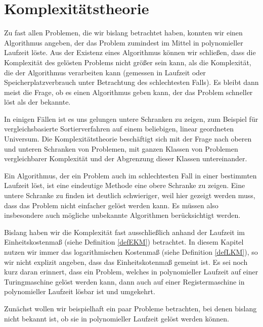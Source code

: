 \chapter{Komplexitätstheorie}
Zu fast allen Problemen, die wir bislang betrachtet haben, konnten wir einen Algorithmus angeben, der das Problem zumindest im Mittel in polynomieller Laufzeit löste. Aus der Existenz eines Algorithmus können wir schließen, dass die Komplexität des gelösten Problems nicht größer sein kann, als die Komplexität, die der Algorithmus verarbeiten kann (gemessen in Laufzeit oder Speicherplatzverbrauch unter Betrachtung des schlechtesten Falls). Es bleibt dann meist die Frage, ob es einen Algorithmus geben kann, der das Problem schneller löst als der bekannte.

In einigen Fällen ist es uns gelungen untere Schranken zu zeigen, zum Beispiel für vergleichsbasierte Sortierverfahren auf einem beliebigen, linear geordneten Universum. Die Komplexitätstheorie beschäftigt sich mit der Frage nach oberen und unteren Schranken von Problemen, mit ganzen Klassen von Problemen vergleichbarer Komplexität und der Abgrenzung dieser Klassen untereinander.

Ein Algorithmus, der ein Problem auch im schlechtesten Fall in einer bestimmten Laufzeit löst, ist eine eindeutige Methode eine obere Schranke zu zeigen. Eine untere Schranke zu finden ist deutlich schwieriger, weil hier gezeigt werden muss, dass das Problem nicht einfacher gelöst werden kann. Es müssen also insbesondere auch mögliche unbekannte Algorithmen berücksichtigt werden.

Bislang haben wir die Komplexität fast ausschließlich anhand der Laufzeit im Einheitskostenmaß (siehe Definition \vref{defEKM}) betrachtet. In diesem Kapitel nutzen wir immer das logarithmischen Kostenmaß (siehe Definition \vref{defLKM}), so wir nicht explizit angeben, dass das Einheitskotenmaß gemeint ist. Es sei noch kurz daran erinnert, dass ein Problem, welches in polynomieller Laufzeit auf einer Turingmaschine gelöst werden kann, dann auch auf einer Registermaschine in polynomieller Laufzeit lösbar ist und umgekehrt.

Zunächst wollen wir beispielhaft ein paar Probleme betrachten, bei denen bislang nicht bekannt ist, ob sie in polynomieller Laufzeit gelöst werden können.

